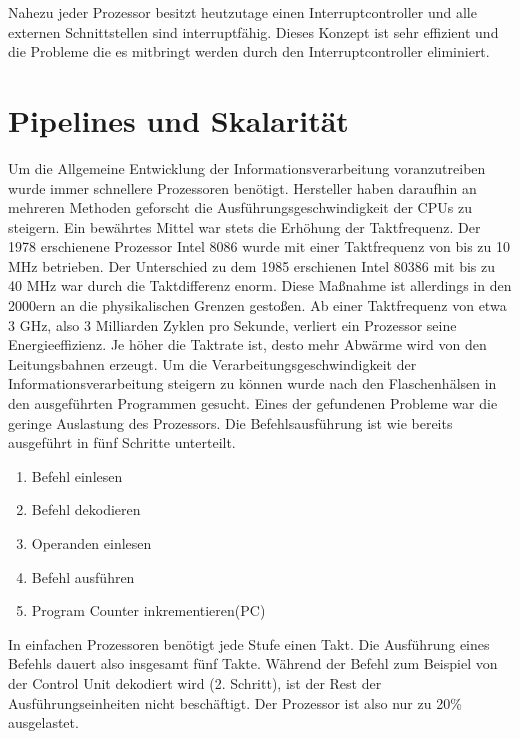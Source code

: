 \documentclass[12pt]{article}
\begin{document}
Nahezu jeder Prozessor besitzt heutzutage einen Interruptcontroller und alle externen Schnittstellen sind interruptfähig. Dieses Konzept ist sehr effizient und die Probleme die es mitbringt werden durch den Interruptcontroller eliminiert.

\newpage

\section{Pipelines und Skalarität}
Um die Allgemeine Entwicklung der Informationsverarbeitung voranzutreiben wurde immer schnellere Prozessoren benötigt. Hersteller haben daraufhin an mehreren Methoden geforscht die Ausführungsgeschwindigkeit der CPUs zu steigern. Ein bewährtes Mittel war stets die Erhöhung der Taktfrequenz. Der 1978 erschienene Prozessor Intel 8086 wurde mit einer Taktfrequenz von bis zu 10 MHz betrieben. Der Unterschied zu dem 1985 erschienen Intel 80386 mit bis zu 40 MHz war durch die Taktdifferenz enorm. Diese Maßnahme ist allerdings in den 2000ern an die physikalischen Grenzen gestoßen. Ab einer Taktfrequenz von etwa 3 GHz, also 3 Milliarden Zyklen pro Sekunde, verliert ein Prozessor seine Energieeffizienz. Je höher die Taktrate ist, desto mehr Abwärme wird von den Leitungsbahnen erzeugt.
Um die Verarbeitungsgeschwindigkeit der Informationsverarbeitung steigern zu können wurde nach den Flaschenhälsen in den ausgeführten Programmen gesucht. Eines der gefundenen Probleme war die geringe Auslastung des Prozessors. Die Befehlsausführung ist wie bereits ausgeführt in fünf Schritte unterteilt.
\begin{enumerate}
\item Befehl einlesen
\item Befehl dekodieren
\item Operanden einlesen
\item Befehl ausführen 
\item Program Counter inkrementieren(PC)
\end{enumerate}
In einfachen Prozessoren benötigt jede Stufe einen Takt. Die Ausführung eines Befehls dauert also insgesamt fünf Takte. Während der Befehl zum Beispiel von der Control Unit dekodiert wird (2. Schritt), ist der Rest der Ausführungseinheiten nicht beschäftigt. Der Prozessor ist also nur zu 20\% ausgelastet. 
\end{document}
